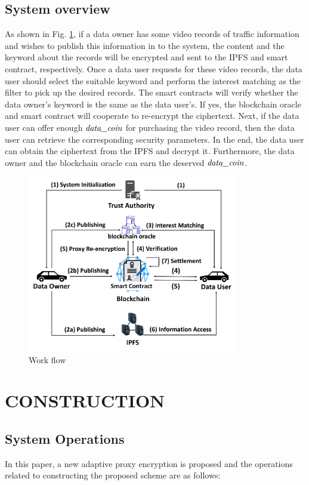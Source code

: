 \documentclass[journal,10pt]{IEEEtran}
\begin{document}
\subsection{System overview} 
As shown in Fig. \ref{fig:work_flow}, if a data owner has some video records of traffic information and wishes to publish this information in to the system, the content and the keyword about the records will be encrypted and sent to the IPFS and smart contract, respectively. Once a data user requests for these video records, the data user should select the suitable keyword and perform the interest matching as the filter to pick up the desired records. The smart contracts will verify  whether the data owner's keyword is the same as the data user's. If yes, the blockchain oracle and smart contract will cooperate to re-encrypt the ciphertext. Next, if the data user can offer enough $\emph{data\_coin}$ for purchasing the video record, then the data user can retrieve the corresponding security parameters. In the end, the data user can  obtain the ciphertext from the IPFS and decrypt it. Furthermore, the data owner and the blockchain oracle can earn the deserved $\emph{data\_coin}$.  

\begin{figure}[h]
    \centering
    \includegraphics[width=260pt]{picture/flow2.png}
    \caption{Work flow}
    \label{fig:work_flow}
\end{figure}

\section{CONSTRUCTION}

\subsection{System Operations}
In this paper, a new adaptive proxy encryption is proposed and the operations related to constructing the proposed scheme are as follows:
\end{document}
